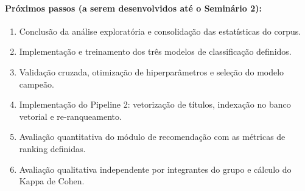 \documentclass{IEEEtran}
\begin{document}
\paragraph{Próximos passos (a serem desenvolvidos até o Seminário 2):}
\begin{enumerate}[noitemsep]
  \item Conclusão da análise exploratória e consolidação das estatísticas do corpus.
  \item Implementação e treinamento dos três modelos de classificação definidos.
  \item Validação cruzada, otimização de hiperparâmetros e seleção do modelo campeão.
  \item Implementação do Pipeline 2: vetorização de títulos, indexação no banco vetorial e re-ranqueamento.
  \item Avaliação quantitativa do módulo de recomendação com as métricas de ranking definidas.
  \item Avaliação qualitativa independente por integrantes do grupo e cálculo do Kappa de Cohen.
\end{enumerate}



\end{document}
